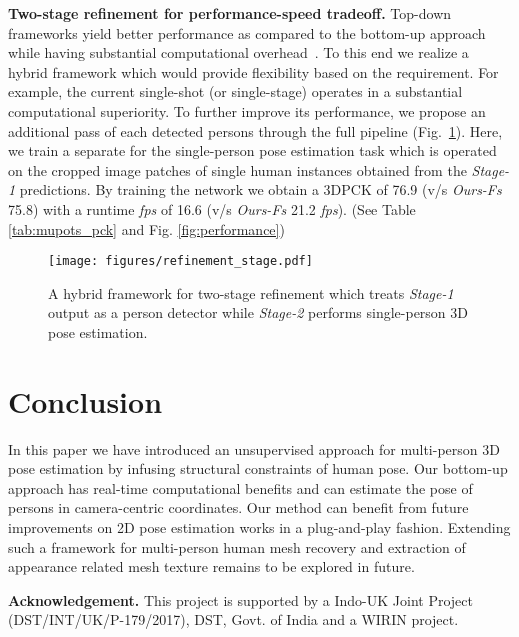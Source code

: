 \documentclass[runningheads]{llncs}
\begin{document}
\textbf{Two-stage refinement for performance-speed tradeoff.}
Top-down frameworks yield better performance as compared to the bottom-up approach while having substantial computational overhead~\cite{kocabas2018multiposenet}. To this end we realize a hybrid framework which would provide flexibility based on the requirement. For example, the current single-shot (or single-stage)  operates in a substantial computational superiority. To further improve its performance, we propose an additional pass of each detected persons through the full pipeline (Fig.~\ref{fig:stage2}). Here, we train a separate  for the single-person pose estimation task which is operated on the cropped image patches of single human instances obtained from the \textit{Stage-1} predictions. By training the  network we obtain a 3DPCK of 76.9 (v/s \textit{Ours-Fs} 75.8) with a runtime \textit{fps} of 16.6 (v/s \textit{Ours-Fs} 21.2 \textit{fps}). (See Table \ref{tab:mupots_pck} and Fig. \ref{fig:performance})

\begin{figure}[t]
    \centering
    \texttt{[image: figures/refinement\_stage.pdf]} 
    \caption{A hybrid framework for two-stage refinement which treats \textit{Stage-1} output as a person detector while \textit{Stage-2} performs single-person 3D pose estimation. \vspace{-2mm}
    }
    \label{fig:stage2}
\end{figure}

\vspace{-2mm}
\section{Conclusion}
In this paper we have introduced an unsupervised approach 
for multi-person 3D pose estimation by infusing structural constraints of human pose. Our bottom-up approach has real-time computational benefits and can estimate the pose of persons in camera-centric coordinates. Our method can benefit from future improvements on 2D pose estimation works in a plug-and-play fashion. Extending such a framework for multi-person human mesh recovery and extraction of appearance related mesh texture remains to be explored in future.

\noindent\textbf{Acknowledgement.} This project is supported by a Indo-UK Joint Project (DST/INT/UK/P-179/2017), DST, Govt. of India and a WIRIN project.

\clearpage


 
 
 
 

 
 
  
 








\end{document}
